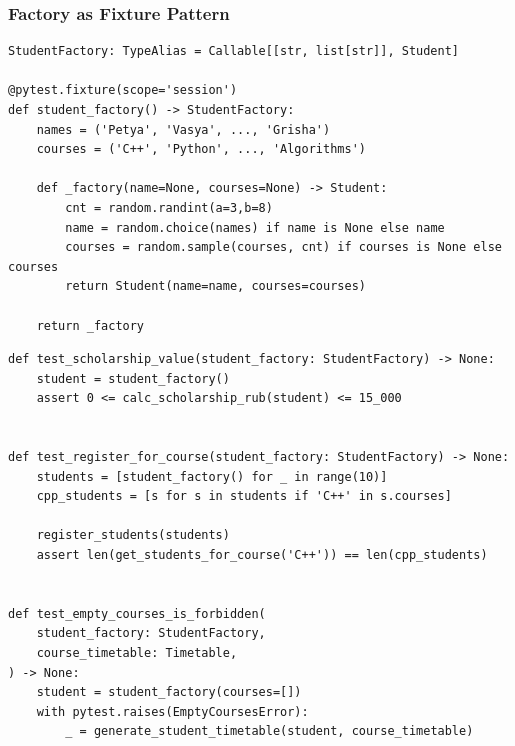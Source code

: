\documentclass[compress]{beamer}
\begin{document}
\begin{frame}[fragile]
\frametitle{Factory as Fixture Pattern}

\begin{overprint}
\begin{center}
\begin{verbatim}
StudentFactory: TypeAlias = Callable[[str, list[str]], Student]

@pytest.fixture(scope='session')
def student_factory() -> StudentFactory:
    names = ('Petya', 'Vasya', ..., 'Grisha')
    courses = ('C++', 'Python', ..., 'Algorithms')

    def _factory(name=None, courses=None) -> Student:
        cnt = random.randint(a=3,b=8)
        name = random.choice(names) if name is None else name
        courses = random.sample(courses, cnt) if courses is None else courses
        return Student(name=name, courses=courses)

    return _factory
\end{verbatim}
\end{center}

\begin{center}
\begin{verbatim}
def test_scholarship_value(student_factory: StudentFactory) -> None:
    student = student_factory()
    assert 0 <= calc_scholarship_rub(student) <= 15_000


def test_register_for_course(student_factory: StudentFactory) -> None:
    students = [student_factory() for _ in range(10)]
    cpp_students = [s for s in students if 'C++' in s.courses]

    register_students(students)
    assert len(get_students_for_course('C++')) == len(cpp_students)


def test_empty_courses_is_forbidden(
    student_factory: StudentFactory,
    course_timetable: Timetable,
) -> None:
    student = student_factory(courses=[])
    with pytest.raises(EmptyCoursesError):
        _ = generate_student_timetable(student, course_timetable)
\end{verbatim}
\end{center}
\end{overprint}

\end{frame}
\end{document}

